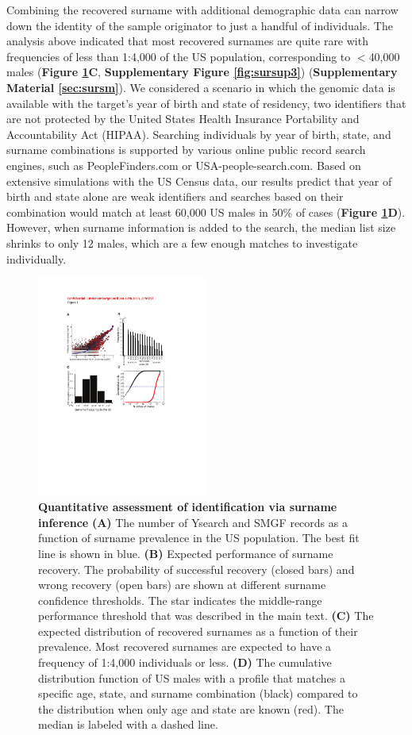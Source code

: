 Combining the recovered surname with additional demographic data can narrow down the identity of the sample originator to just a handful of individuals. The analysis above indicated that most recovered surnames are quite rare with frequencies of less than 1:4,000 of the US population, corresponding to $<$40,000 males (\textbf{Figure \ref{fig:surfig1}C}, \textbf{Supplementary Figure \ref{fig:sursup3}}) (\textbf{Supplementary Material \ref{sec:sursm}}). We considered a scenario in which the genomic data is available with the target's year of birth and state of residency, two identifiers that are not protected by the United States Health Insurance Portability and Accountability Act (HIPAA). Searching individuals by year of birth, state, and surname combinations is supported by various online public record search engines, such as PeopleFinders.com or USA-people-search.com. Based on extensive simulations with the US Census data, our results predict that year of birth and state alone are weak identifiers and searches based on their combination would match at least 60,000 US males in 50\% of cases (\textbf{Figure \ref{fig:surfig1}D}). However, when surname information is added to the search, the median list size shrinks to only 12 males, which are a few enough matches to investigate individually.

\begin{figure}[h!]
\centering
\label{fig:surfig1}
\includegraphics[width=0.5\textwidth]{Figures/App1/Fig1.pdf}
\caption{\textbf{Quantitative assessment of identification via surname inference} \textbf{(A)} The number of Ysearch and SMGF records as a function of surname prevalence in the US population. The best fit line is shown in blue. \textbf{(B)} Expected performance of surname recovery. The probability of successful recovery (closed bars) and wrong recovery (open bars) are shown at different surname confidence thresholds. The star indicates the middle-range performance threshold that was described in the main text. \textbf{(C)} The expected distribution of recovered surnames as a function of their prevalence. Most recovered surnames are expected to have a frequency of 1:4,000 individuals or less. \textbf{(D)} The cumulative distribution function of US males with a profile that matches a specific age, state, and surname combination (black) compared to the distribution when only age and state are known (red). The median is labeled with a dashed line.}
\end{figure}

